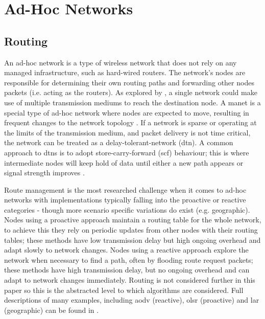 \section{Ad-Hoc Networks}\label{sec:adhocnetworks}
\subsection{Routing}
An ad-hoc network is a type of wireless network that does not rely on any managed infrastructure, such as hard-wired routers. The network's nodes are responsible for determining their own routing paths and forwarding other nodes packets (i.e. acting as the routers). As explored by \cite{3YP:LORAWAN_MESH}, a single network could make use of multiple transmission mediums to reach the destination node. A \ac{manet} is a special type of ad-hoc network where nodes are expected to move, resulting in frequent changes to the network topology \cite{3YP:MANET_RFC2501}. If a network is sparse or operating at the limits of the transmission medium, and packet delivery is not time critical, the network can be treated as a delay-tolerant-network (\ac{dtn}). A common approach to \ac{dtn}s is to adopt store-carry-forward (\ac{scf}) behaviour; this is where intermediate nodes will keep hold of data until either a new path appears or signal strength improves \cite{3YP:DTNS}.
 
 Route management is the most researched challenge when it comes to ad-hoc networks \cite{3YP:MANET_RESEARCH_TRENDS} with implementations typically falling into the proactive or reactive categories - though more scenario specific variations do exist (e.g. geographic). Nodes using a proactive approach maintain a routing table for the whole network, to achieve this they rely on periodic updates from other nodes with their routing tables; these methods have low transmission delay but high ongoing overhead and adapt slowly to network changes. Nodes using a reactive approach explore the network when necessary to find a path, often by flooding route request packets; these methods have high transmission delay, but no ongoing overhead and can adapt to network changes immediately. Routing is not considered further in this paper so this is the abstracted level to which algorithms are considered. Full descriptions of many examples, including \ac{aodv} (reactive), \ac{olsr} (proactive) and \ac{lar} (geographic) can be found in \cite{3YP:ROUTING_ALGORITHMS}.
 

